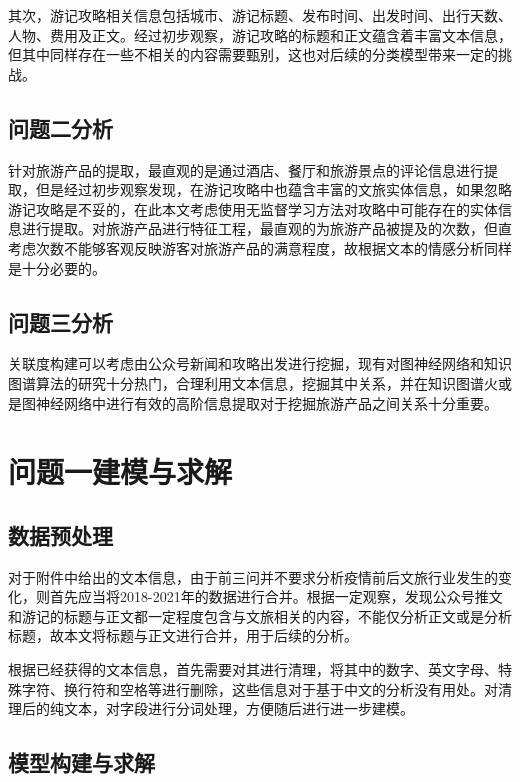 \documentclass[bwprint]{gmcmthesis}
\begin{document}
其次，游记攻略相关信息包括城市、游记标题、发布时间、出发时间、出行天数、人物、费用及正文。经过初步观察，游记攻略的标题和正文蕴含着丰富文本信息，但其中同样存在一些不相关的内容需要甄别，这也对后续的分类模型带来一定的挑战。


\subsection{问题二分析}
针对旅游产品的提取，最直观的是通过酒店、餐厅和旅游景点的评论信息进行提取，但是经过初步观察发现，在游记攻略中也蕴含丰富的文旅实体信息，如果忽略游记攻略是不妥的，在此本文考虑使用无监督学习方法对攻略中可能存在的实体信息进行提取。对旅游产品进行特征工程，最直观的为旅游产品被提及的次数，但直考虑次数不能够客观反映游客对旅游产品的满意程度，故根据文本的情感分析同样是十分必要的。



\subsection{问题三分析}
关联度构建可以考虑由公众号新闻和攻略出发进行挖掘，现有对图神经网络和知识图谱算法的研究十分热门，合理利用文本信息，挖掘其中关系，并在知识图谱火或是图神经网络中进行有效的高阶信息提取对于挖掘旅游产品之间关系十分重要。

\section{问题一建模与求解}

\subsection{数据预处理}

对于附件中给出的文本信息，由于前三问并不要求分析疫情前后文旅行业发生的变化，则首先应当将2018-2021年的数据进行合并。根据一定观察，发现公众号推文和游记的标题与正文都一定程度包含与文旅相关的内容，不能仅分析正文或是分析标题，故本文将标题与正文进行合并，用于后续的分析。

根据已经获得的文本信息，首先需要对其进行清理，将其中的数字、英文字母、特殊字符、换行符和空格等进行删除，这些信息对于基于中文的分析没有用处。对清理后的纯文本，对字段进行分词处理，方便随后进行进一步建模。

\subsection{模型构建与求解}
\end{document}
